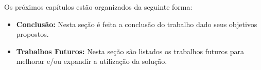 Os próximos capítulos estão organizados da seguinte forma:

\begin{itemize}
  \item \textbf{Conclusão:} Nesta seção é feita a conclusão do trabalho dado seus objetivos propostos.
  \item \textbf{Trabalhos Futuros:} Nesta seção são listados os trabalhos futuros para melhorar e/ou expandir a utilização da solução.
\end{itemize}
